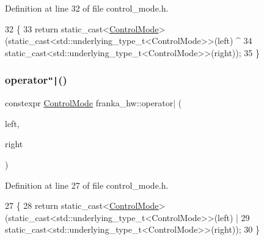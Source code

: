 Definition at line 32 of file control\+\_\+mode.\+h.


\begin{DoxyCode}
32                                                                      \{
33   \textcolor{keywordflow}{return} \textcolor{keyword}{static\_cast<}\hyperlink{namespacefranka__hw_afa416558ce4baace5ac6c71bd5d2c98c}{ControlMode}\textcolor{keyword}{>}(\textcolor{keyword}{static\_cast<}std::underlying\_type\_t<ControlMode>\textcolor{keyword}{>}(left) ^
34                                   \textcolor{keyword}{static\_cast<}std::underlying\_type\_t<ControlMode>\textcolor{keyword}{>}(right));
35 \}
\end{DoxyCode}
\mbox{\label{namespacefranka__hw_aa04e36b77fe247b4ef736bb0abc2ac24}} 
\subsubsection{\texorpdfstring{operator\texttt{"|}()}{operator|()}}
{\footnotesize\ttfamily constexpr \hyperlink{namespacefranka__hw_afa416558ce4baace5ac6c71bd5d2c98c}{Control\+Mode} franka\+\_\+hw\+::operator$\vert$ (\begin{DoxyParamCaption}\item[{\hyperlink{namespacefranka__hw_afa416558ce4baace5ac6c71bd5d2c98c}{Control\+Mode}}]{left,  }\item[{\hyperlink{namespacefranka__hw_afa416558ce4baace5ac6c71bd5d2c98c}{Control\+Mode}}]{right }\end{DoxyParamCaption})}



Definition at line 27 of file control\+\_\+mode.\+h.


\begin{DoxyCode}
27                                                                      \{
28   \textcolor{keywordflow}{return} \textcolor{keyword}{static\_cast<}\hyperlink{namespacefranka__hw_afa416558ce4baace5ac6c71bd5d2c98c}{ControlMode}\textcolor{keyword}{>}(\textcolor{keyword}{static\_cast<}std::underlying\_type\_t<ControlMode>\textcolor{keyword}{>}(left) |
29                                   \textcolor{keyword}{static\_cast<}std::underlying\_type\_t<ControlMode>\textcolor{keyword}{>}(right));
30 \}
\end{DoxyCode}
\mbox{\label{namespacefranka__hw_a8763373676dcb02e2c2ac1f4e7613a8d}} 

